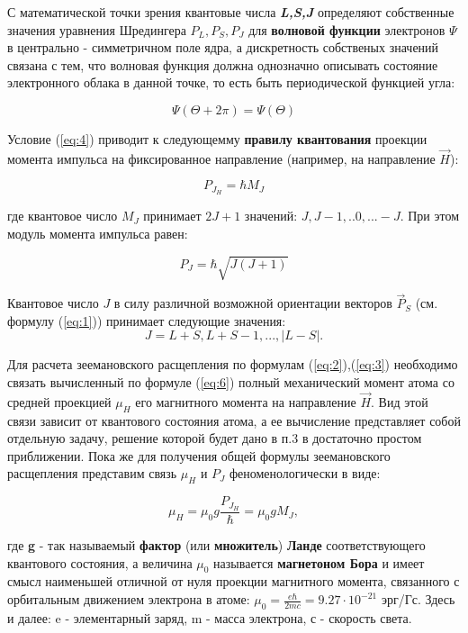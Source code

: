 С математической точки зрения квантовые числа \textbf{\textsl{ L,S,J}} определяют собственные значения уравнения Шредингера $\mathbf{\mathit{P_L,P_S,P_J}}$ 
для \textbf{волновой функции} электронов $\Psi$ в центрально - симметричном поле ядра, а дискретность собственых значений связана с тем, что волновая функция должна однозначно описывать состояние электронного облака в данной точке, то есть быть периодической функцией угла:

\begin{equation}
\Psi(\Theta+2\pi)=\Psi(\Theta)
\label{eq:4} 
\end{equation}

Условие (\ref{eq:4}) приводит к следующемму \textbf{правилу квантования} проекции момента импульса на фиксированное направление (например, на направление $\vec{H}$):

\begin{equation}
P_{J_H} = \hbar M_J
\label{eq:5} 
\end{equation}

где квантовое число $M_{J}$ принимает $2J+1$ значений: $J,J-1,..0,...-J$.  При этом модуль момента импульса равен: 

\begin{equation}
P_{J}=\hbar \sqrt {J(J+1)}
\label{eq:6} 
\end{equation}

Квантовое число $J$ в силу различной возможной ориентации векторов $\vec P_S$ (см. формулу (\ref{eq:1})) принимает следующие значения: $$J=L+S,L+S-1,...,|L-S|.$$

Для расчета зеемановского расщепления по формулам (\ref{eq:2}),(\ref{eq:3}) необходимо связать вычисленный по формуле (\ref{eq:6}) полный механический момент атома со средней проекцией 
$\mu_H$ его магнитного момента на направление $\vec H$. Вид этой связи зависит от квантового состояния атома, а ее вычисление представляет собой отдельную задачу, решение которой будет дано в п.3 в достаточно простом приближении. Пока же для получения общей формулы зеемановского расщепления представим связь $\mu_H$ и $P_J$ феноменологически в виде: 

\begin{equation}
\mu_{H}=\mu_{0} g \frac{P_{J_H}}{\hbar}=\mu_{0} g M_{J},
\label{eq:7} 
\end{equation}

где \textbf{g} - так называемый \textbf{фактор} (или \textbf{множитель}) \textbf{Ланде} соответствующего квантового состояния, а величина $\mu_0$ называется \textbf{магнетоном Бора} и имеет смысл наименьшей отличной от нуля проекции магнитного момента, связанного с орбитальным движением электрона в атоме: 
$\displaystyle{\mu_{0} = {\frac{e\hbar}{2mc}}=9.27\cdot10^{-21}}$
эрг/Гс.
Здесь и далее: e - элементарный заряд, m - масса электрона, с - скорость света.

